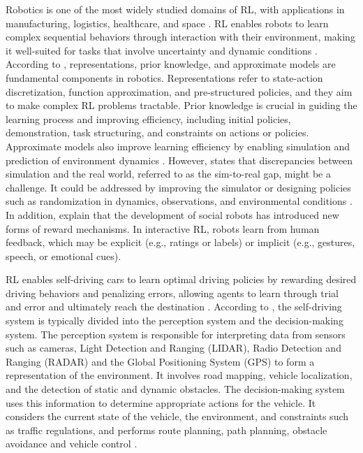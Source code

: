 \documentclass[
  authoryear,
  preprint]{elsarticle}
\begin{document}
Robotics is one of the most widely studied domains of RL, with
applications in manufacturing, logistics, healthcare, and space
\citep{Li2019}. RL enables robots to learn complex sequential behaviors
through interaction with their environment, making it well-suited for
tasks that involve uncertainty and dynamic conditions \citep{Li2019}.
According to \citet{Kober2013}, representations, prior knowledge, and
approximate models are fundamental components in robotics.
Representations refer to state-action discretization, function
approximation, and pre-structured policies, and they aim to make complex
RL problems tractable. Prior knowledge is crucial in guiding the
learning process and improving efficiency, including initial policies,
demonstration, task structuring, and constraints on actions or policies.
Approximate models also improve learning efficiency by enabling
simulation and prediction of environment dynamics \citep{Kober2013}.
However, \citet{Li2019} states that discrepancies between simulation and
the real world, referred to as the sim-to-real gap, might be a
challenge. It could be addressed by improving the simulator or designing
policies such as randomization in dynamics, observations, and
environmental conditions \citep{Li2019}. In addition, \citet{Akalin2021}
explain that the development of social robots has introduced new forms
of reward mechanisms. In interactive RL, robots learn from human
feedback, which may be explicit (e.g., ratings or labels) or implicit
(e.g., gestures, speech, or emotional cues).

RL enables self-driving cars to learn optimal driving policies by
rewarding desired driving behaviors and penalizing errors, allowing
agents to learn through trial and error and ultimately reach the
destination \citep{Sivamayil2023}. According to \citet{Badue2021}, the
self-driving system is typically divided into the perception system and
the decision-making system. The perception system is responsible for
interpreting data from sensors such as cameras, Light Detection and
Ranging (LIDAR), Radio Detection and Ranging (RADAR) and the Global
Positioning System (GPS) to form a representation of the environment. It
involves road mapping, vehicle localization, and the detection of static
and dynamic obstacles. The decision-making system uses this information
to determine appropriate actions for the vehicle. It considers the
current state of the vehicle, the environment, and constraints such as
traffic regulations, and performs route planning, path planning,
obstacle avoidance and vehicle control \citep{Badue2021}.
\end{document}
